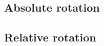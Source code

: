 





\subsection{Absolute rotation}
\label{sec:abs-rot}

\subsection{Relative rotation}
\label{sec:rel-rot}



